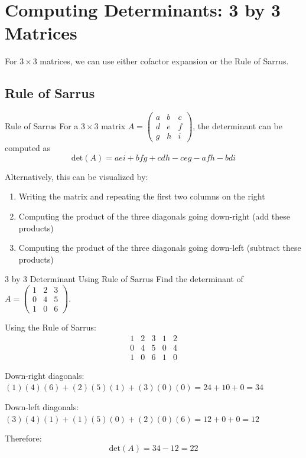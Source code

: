 \documentclass[12pt,a4paper]{article}
\newcommand{\Det}{\text{det}}
\begin{document}
	\section{Computing Determinants: 3 by 3 Matrices}
	
	For $3 \times 3$ matrices, we can use either cofactor expansion or the Rule of Sarrus.
	
	\subsection{Rule of Sarrus}
	
	\begin{definition}{Rule of Sarrus}
		For a $3 \times 3$ matrix $A = \begin{pmatrix} a & b & c \\ d & e & f \\ g & h & i \end{pmatrix}$, the determinant can be computed as
		\[
		\Det(A) = aei + bfg + cdh - ceg - afh - bdi
		\]
		
		Alternatively, this can be visualized by:
		\begin{enumerate}
			\item Writing the matrix and repeating the first two columns on the right
			\item Computing the product of the three diagonals going down-right (add these products)
			\item Computing the product of the three diagonals going down-left (subtract these products)
		\end{enumerate}
	\end{definition}
	
	\begin{example}{3 by 3 Determinant Using Rule of Sarrus}
		Find the determinant of $A = \begin{pmatrix} 1 & 2 & 3 \\ 0 & 4 & 5 \\ 1 & 0 & 6 \end{pmatrix}$.
		
		Using the Rule of Sarrus:
		\[
		\begin{array}{ccccc}
			1 & 2 & 3 & 1 & 2 \\
			0 & 4 & 5 & 0 & 4 \\
			1 & 0 & 6 & 1 & 0
		\end{array}
		\]
		
		Down-right diagonals: $(1)(4)(6) + (2)(5)(1) + (3)(0)(0) = 24 + 10 + 0 = 34$
		
		Down-left diagonals: $(3)(4)(1) + (1)(5)(0) + (2)(0)(6) = 12 + 0 + 0 = 12$
		
		Therefore:
		\[
		\Det(A) = 34 - 12 = 22
		\]
	\end{example}
	
\end{document}
